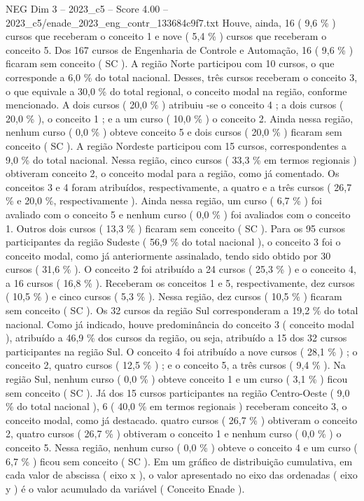 \begin{textsample}{NEG Dim 3 – 2023\_c5 – Score 4.00 – 2023\_c5/enade\_2023\_eng\_contr\_133684c9f7.txt}
Houve, ainda, 16 ( 9,6 \% ) cursos que receberam o conceito 1 e nove ( 5,4 \% ) cursos que receberam o conceito 5.
Dos 167 cursos de Engenharia de Controle e Automação, 16 ( 9,6 \% ) ficaram sem conceito ( SC ).
A região Norte participou com 10 cursos, o que corresponde a 6,0 \% do total nacional.
Desses, três cursos receberam o conceito 3, o que equivale a 30,0 \% do total regional, o conceito modal na região, conforme mencionado.
A dois cursos ( 20,0 \% ) atribuiu -se o conceito 4 ; a dois cursos ( 20,0 \% ), o conceito 1 ; e a um curso ( 10,0 \% ) o conceito 2.
Ainda nessa região, nenhum curso ( 0,0 \% ) obteve conceito 5 e dois cursos ( 20,0 \% ) ficaram sem conceito ( SC ).
A região Nordeste participou com 15 cursos, correspondentes a 9,0 \% do total nacional.
Nessa região, cinco cursos ( 33,3 \% em termos regionais ) obtiveram conceito 2, o conceito modal para a região, como já comentado.
Os conceitos 3 e 4 foram atribuídos, respectivamente, a quatro e a três cursos ( 26,7 \% e 20,0 \%, respectivamente ).
Ainda nessa região, um curso ( 6,7 \% ) foi avaliado com o conceito 5 e nenhum curso ( 0,0 \% ) foi avaliados com o conceito 1.
Outros dois cursos ( 13,3 \% ) ficaram sem conceito ( SC ).
Para os 95 cursos participantes da região Sudeste ( 56,9 \% do total nacional ), o conceito 3 foi o conceito modal, como já anteriormente assinalado, tendo sido obtido por 30 cursos ( 31,6 \% ).
O conceito 2 foi atribuído a 24 cursos ( 25,3 \% ) e o conceito 4, a 16 cursos ( 16,8 \% ).
Receberam os conceitos 1 e 5, respectivamente, dez cursos ( 10,5 \% ) e cinco cursos ( 5,3 \% ).
Nessa região, dez cursos ( 10,5 \% ) ficaram sem conceito ( SC ).
Os 32 cursos da região Sul corresponderam a 19,2 \% do total nacional.
Como já indicado, houve predominância do conceito 3 ( conceito modal ), atribuído a 46,9 \% dos cursos da região, ou seja, atribuído a 15 dos 32 cursos participantes na região Sul.
O conceito 4 foi atribuído a nove cursos ( 28,1 \% ) ; o conceito 2, quatro cursos ( 12,5 \% ) ; e o conceito 5, a três cursos ( 9,4 \% ).
Na região Sul, nenhum curso ( 0,0 \% ) obteve conceito 1 e um curso ( 3,1 \% ) ficou sem conceito ( SC ).
Já dos 15 cursos participantes na região Centro-Oeste ( 9,0 \% do total nacional ), 6 ( 40,0 \% em termos regionais ) receberam conceito 3, o conceito modal, como já destacado. quatro cursos ( 26,7 \% ) obtiveram o conceito 2, quatro cursos ( 26,7 \% ) obtiveram o conceito 1 e nenhum curso ( 0,0 \% ) o conceito 5.
Nessa região, nenhum curso ( 0,0 \% ) obteve o conceito 4 e um curso ( 6,7 \% ) ficou sem conceito ( SC ).
Em um gráfico de distribuição cumulativa, em cada valor de abscissa ( eixo x ), o valor apresentado no eixo das ordenadas ( eixo y ) é o valor acumulado da variável ( Conceito Enade ).

\end{textsample}
